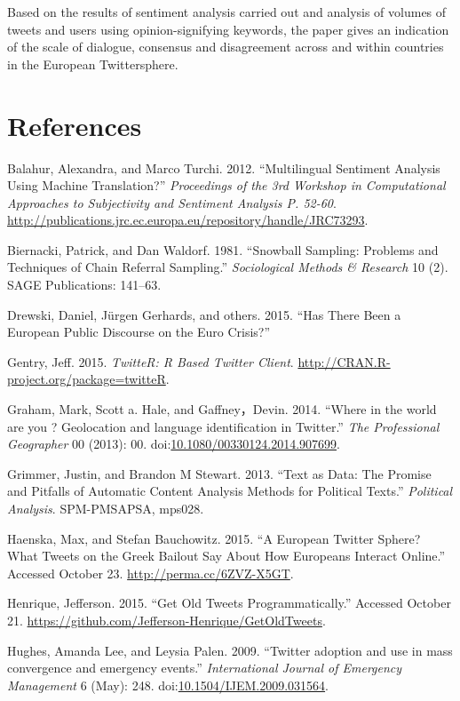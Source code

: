 \documentclass[]{article}
\begin{document}
Based on the results of sentiment analysis carried out and analysis of
volumes of tweets and users using opinion-signifying keywords, the paper
gives an indication of the scale of dialogue, consensus and disagreement
across and within countries in the European Twittersphere.

\section*{References}\label{references}

Balahur, Alexandra, and Marco Turchi. 2012. ``Multilingual Sentiment
Analysis Using Machine Translation?'' \emph{Proceedings of the 3rd
Workshop in Computational Approaches to Subjectivity and Sentiment
Analysis P. 52-60}.
\url{http://publications.jrc.ec.europa.eu/repository/handle/JRC73293}.

Biernacki, Patrick, and Dan Waldorf. 1981. ``Snowball Sampling: Problems
and Techniques of Chain Referral Sampling.'' \emph{Sociological Methods
\& Research} 10 (2). SAGE Publications: 141--63.

Drewski, Daniel, J{ü}rgen Gerhards, and others. 2015. ``Has There Been a
European Public Discourse on the Euro Crisis?''

Gentry, Jeff. 2015. \emph{TwitteR: R Based Twitter Client}.
\url{http://CRAN.R-project.org/package=twitteR}.

Graham, Mark, Scott a. Hale, and Gaffney，Devin. 2014. ``Where in the
world are you ? Geolocation and language identification in Twitter.''
\emph{The Professional Geographer} 00 (2013): 00.
doi:\href{http://dx.doi.org/10.1080/00330124.2014.907699}{10.1080/00330124.2014.907699}.

Grimmer, Justin, and Brandon M Stewart. 2013. ``Text as Data: The
Promise and Pitfalls of Automatic Content Analysis Methods for Political
Texts.'' \emph{Political Analysis}. SPM-PMSAPSA, mps028.

Haenska, Max, and Stefan Bauchowitz. 2015. ``A European Twitter Sphere?
What Tweets on the Greek Bailout Say About How Europeans Interact
Online.'' Accessed October 23. \url{http://perma.cc/6ZVZ-X5GT}.

Henrique, Jefferson. 2015. ``Get Old Tweets Programmatically.'' Accessed
October 21. \url{https://github.com/Jefferson-Henrique/GetOldTweets}.

Hughes, Amanda Lee, and Leysia Palen. 2009. ``Twitter adoption and use
in mass convergence and emergency events.'' \emph{International Journal
of Emergency Management} 6 (May): 248.
doi:\href{http://dx.doi.org/10.1504/IJEM.2009.031564}{10.1504/IJEM.2009.031564}.
\end{document}
